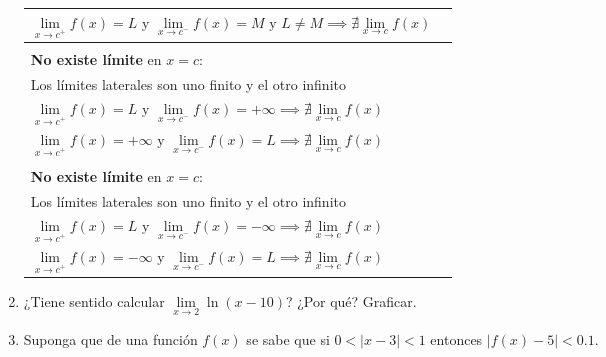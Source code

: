 \documentclass[12pt]{article}
\theoremstyle{definition}
\begin{document}
\begin{enumerate}
{\begin{longtable}{|p{}|p{}|}
$\lim\limits_{x \to c^+} f(x) = L \text{ y } \lim\limits_{x \to c^-} f(x) = M \text{ y } L \neq M \implies \nexists \lim\limits_{x \to c} f(x)$ \vspace{2mm} & \\
\hline & \\
\textbf{No existe límite} en $x = c$: & \\
Los límites laterales son uno finito y el otro infinito \smallskip & \\
$\lim\limits_{x \to c^+} f(x) = L \text{ y } \lim\limits_{x \to c^-} f(x) = +\infty \implies \nexists \lim\limits_{x \to c} f(x)$ \smallskip & \\
$\lim\limits_{x \to c^+} f(x) = +\infty \text{ y } \lim\limits_{x \to c^-} f(x) = L \implies \nexists \lim\limits_{x \to c} f(x)$ \vspace{2mm} & \\
\hline &\\
\textbf{No existe límite} en $x = c$: & \\
Los límites laterales son uno finito y el otro infinito \smallskip & \\
$\lim\limits_{x \to c^+} f(x) = L \text{ y } \lim\limits_{x \to c^-} f(x) = -\infty \implies \nexists \lim\limits_{x \to c} f(x)$ \smallskip & \\
$\lim\limits_{x \to c^+} f(x) = -\infty \text{ y } \lim\limits_{x \to c^-} f(x) = L \implies \nexists \lim\limits_{x \to c} f(x)$ \vspace{2mm} & \\
\hline
\end{longtable}
}

\item ¿Tiene sentido calcular $\lim\limits_{x \to 2} \ln(x - 10)$? ¿Por qué? Graficar.

\item Suponga que de una función $f(x)$ se sabe que si $0 < |x - 3| < 1$ entonces $|f(x) - 5| < 0.1$.


\end{enumerate}
\end{document}
